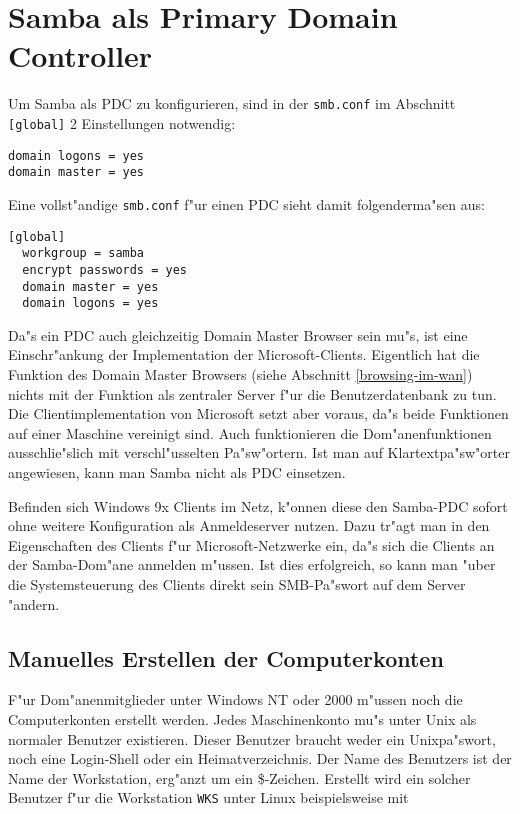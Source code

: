 \documentclass{scrartcl}\usepackage{pslatex}\typearea{12}
\newcommand{\param}{\texttt}
\newcommand{\dateistyle}{\texttt}
\newcommand{\nbname}{\texttt}
\begin{document}
\section{Samba als Primary Domain Controller}

Um Samba als PDC zu konfigurieren, sind in der \dateistyle{smb.conf}
im Abschnitt \param{[global]} 2 Einstellungen notwendig:

\begin{verbatim}
domain logons = yes
domain master = yes
\end{verbatim}

Eine vollst"andige \dateistyle{smb.conf} f"ur einen PDC sieht damit
folgenderma"sen aus\label{pdc-smbconf}:

\begin{verbatim}
[global]
  workgroup = samba
  encrypt passwords = yes
  domain master = yes
  domain logons = yes
\end{verbatim}

Da"s ein PDC auch gleichzeitig Domain Master Browser sein mu"s, ist
eine Einschr"ankung der Implementation der Microsoft-Clients.
Eigentlich hat die Funktion des Domain Master Browsers (siehe
Abschnitt \ref{browsing-im-wan}) nichts mit der Funktion als zentraler
Server f"ur die Benutzerdatenbank zu tun. Die Clientimplementation von
Microsoft setzt aber voraus, da"s beide Funktionen auf einer Maschine
vereinigt sind. Auch funktionieren die Dom"anenfunktionen
ausschlie"slich mit verschl"usselten Pa"sw"ortern. Ist man auf
Klartextpa"sw"orter angewiesen, kann man Samba nicht als PDC
einsetzen.

Befinden sich Windows 9x Clients im Netz, k"onnen diese den Samba-PDC
sofort ohne weitere Konfiguration als Anmeldeserver nutzen. Dazu
tr"agt man in den Eigenschaften des Clients f"ur Microsoft-Netzwerke
ein, da"s sich die Clients an der Samba-Dom"ane anmelden m"ussen. Ist
dies erfolgreich, so kann man "uber die Systemsteuerung des Clients
direkt sein SMB-Pa"swort auf dem Server "andern.

\subsection{Manuelles Erstellen der Computerkonten}

F"ur Dom"anenmitglieder unter Windows NT oder 2000 m"ussen noch die
Computerkonten erstellt werden. Jedes Maschinenkonto mu"s unter Unix
als normaler Benutzer existieren. Dieser Benutzer braucht weder ein
Unixpa"swort, noch eine Login-Shell oder ein Heimatverzeichnis.  Der
Name des Benutzers ist der Name der Workstation, erg"anzt um ein
\$-Zeichen. Erstellt wird ein solcher Benutzer f"ur die Workstation
\nbname{WKS} unter Linux beispielsweise mit
\end{document}
